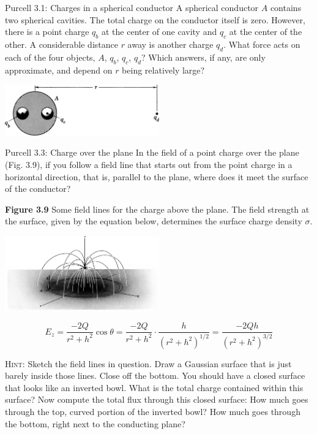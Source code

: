 \documentclass{esg8022pset}
\begin{document}
\begin{problem}{Purcell 3.1: Charges in a spherical conductor}
  A spherical conductor $A$ contains two spherical cavities. The
  total charge on the conductor itself is zero. However, there is a
  point charge $q_b$ at the center of one cavity and $q_c$ at the
  center of the other.  A considerable distance $r$ away is another
  charge $q_d$. What force acts on each of the four objects, $A$,
  $q_b$, $q_c$, $q_d$? Which answers, if any, are only approximate,
  and depend on $r$ being relatively large?
  \begin{center}\includegraphics[width=0.5\textwidth]{ps04_01}\end{center}
\end{problem}
\begin{solution}

\end{solution}


\begin{problem}{Purcell 3.3: Charge over the plane} 
  In the field of a point charge over the plane (Fig. 3.9), if you
  follow a field line that starts out from the point charge in a 
  horizontal direction, that is, parallel to the plane, where does
  it meet the surface of the conductor?
  
  \textbf{Figure 3.9} Some field lines for the charge above the plane. 
  The field strength at the surface, given by the equation below,
  determines the surface charge density $\sigma$. 
  \begin{center}\includegraphics[width=0.5\textwidth]{ps04_02}\end{center}
  \begin{equation*}
    E_z = \frac{-2Q}{r^2 + h^2} \cos\theta = \frac{-2Q}{r^2 + h^2}\cdot \frac{h}{(r^2 + h^2)^{1/2}} = \frac{-2Qh}{(r^2 + h^2)^{3/2}}
  \end{equation*}
  
  \noindent \textsc{Hint}: Sketch the field lines in question.  Draw 
  a Gaussian surface that is just barely inside those lines.  Close 
  off the bottom.  You should have a closed surface that looks like 
  an inverted bowl.  What is the total charge contained within this 
  surface?  Now compute the total flux through this closed surface:
  How much goes through the top, curved portion of the inverted bowl?
  How much goes through the bottom, right next to the conducting plane?
\end{problem}
\begin{solution}

\end{solution}
\end{document}
